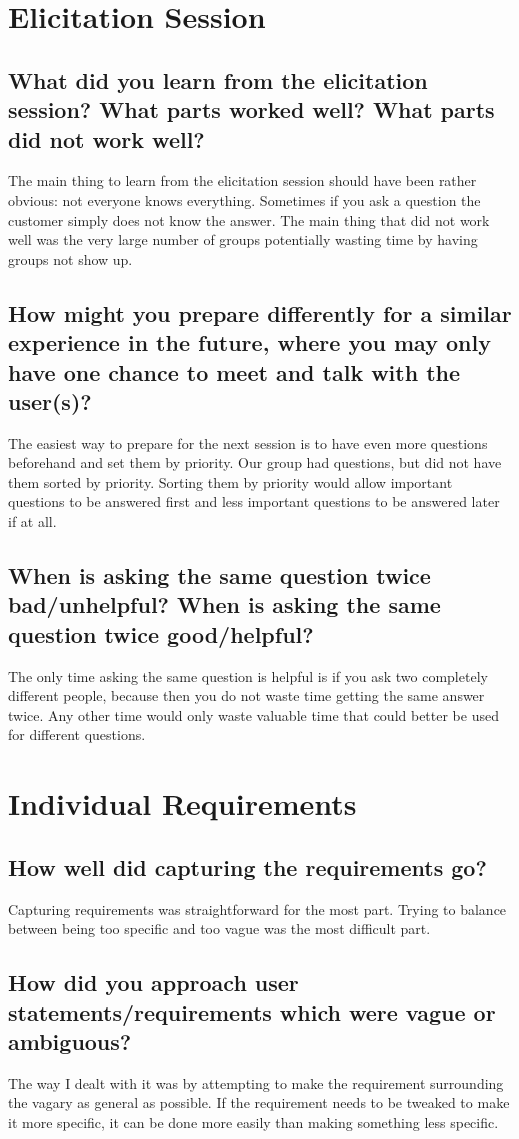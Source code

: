 \documentclass{article}
\begin{document}
\section{Elicitation Session}
    \subsection{What did you learn from the elicitation session? What parts worked well? What parts did not work well?}
 The main thing to learn from the elicitation session should have been rather obvious: not everyone knows everything. Sometimes if you ask a question the customer simply does not know the answer. The main thing that did not work well was the very large number of groups potentially wasting time by having groups not show up.
    \subsection{How might you prepare differently for a similar experience in the future, where you may only have one chance to meet and talk with the user(s)?}
 The easiest way to prepare for the next session is to have even more questions beforehand and set them by priority. Our group had questions, but did not have them sorted by priority. Sorting them by priority would allow important questions to be answered first and less important questions to be answered later if at all.
    \subsection{When is asking the same question twice bad/unhelpful? When is asking the same question twice good/helpful?}
The only time asking the same question is helpful is if you ask two completely different people, because then you do not waste time getting the same answer twice. Any other time would only waste valuable time that could better be used for different questions.

\section{Individual Requirements}
    \subsection{How well did capturing the requirements go?}
 Capturing requirements was straightforward for the most part. Trying to balance between being too specific and too vague was the most difficult part.
    \subsection{How did you approach user statements/requirements which were vague or ambiguous?}
 The way I dealt with it was by attempting to make the requirement surrounding the vagary as general as possible. If the requirement needs to be tweaked to make it more specific, it can be done more easily than making something less specific.
\end{document}
